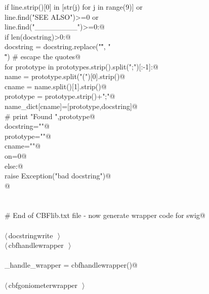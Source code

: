 \documentclass[10pt,a4paper,twoside,notitlepage]{article}
\begin{document}
\begin{flushleft}
\begin{list}{}{}
\mbox{}\verb@      if line.strip()[0] in [str(j) for j in range(9)] or \@\\
\mbox{}\verb@            line.find("SEE ALSO")>=0 or\@\\
\mbox{}\verb@            line.find("________")>=0:@\\
\mbox{}\verb@         if len(docstring)>0:@\\
\mbox{}\verb@            docstring = docstring.replace("\"", "\\\"") # escape the quotes@\\
\mbox{}\verb@            for prototype in prototypes.strip().split(";")[:-1]:@\\
\mbox{}\verb@                name = prototype.split("(")[0].strip()@\\
\mbox{}\verb@                cname = name.split()[1].strip()@\\
\mbox{}\verb@                prototype = prototype.strip()+";"@\\
\mbox{}\verb@                name_dict[cname]=[prototype,docstring]@\\
\mbox{}\verb@      #  print "Found ",prototype@\\
\mbox{}\verb@            docstring="\n"@\\
\mbox{}\verb@            prototype=""@\\
\mbox{}\verb@            cname=""@\\
\mbox{}\verb@            on=0@\\
\mbox{}\verb@         else:@\\
\mbox{}\verb@            raise Exception("bad docstring")@\\
\mbox{}\verb@   @\\
\mbox{}\verb@@\\
\mbox{}\verb@@\\
\mbox{}\verb@# End of CBFlib.txt file - now generate wrapper code for swig@\\
\mbox{}\verb@@\\
\mbox{}\verb@@\hbox{$\langle\,$docstringwrite\nobreak\ {\footnotesize {}}$\,\rangle$}\verb@@\\
\mbox{}\verb@@\hbox{$\langle\,$cbfhandlewrapper\nobreak\ {\footnotesize {}}$\,\rangle$}\verb@@\\
\mbox{}\verb@@\\
\mbox{}\verb@cbf_handle_wrapper = cbfhandlewrapper()@\\
\mbox{}\verb@@\\
\mbox{}\verb@@\hbox{$\langle\,$cbfgoniometerwrapper\nobreak\ {\footnotesize {}}$\,\rangle$}\verb@@\\

\end{list}
\end{flushleft}
\end{document}
